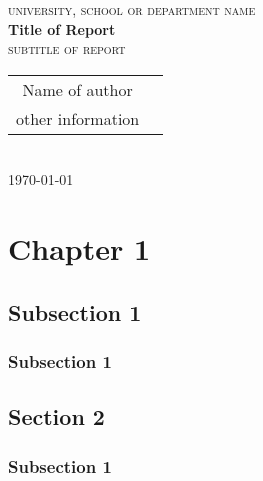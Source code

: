 \documentclass[10pt, a4paper, oneside]{report}
\begin{document}
\thispagestyle{empty}
\begin{center}
  \textsc{university, school or department name} \\ [60pt] 

  \textbf{{\LARGE Title of Report}} \\ [1pt]
  \textsc{{\large subtitle of report }} \\ [20pt]

  \begin{tabular}{cc}
    Name of author  \\
    other information
  \end{tabular} \\ [20pt]
  \today \\
\end{center}
\newpage

\begin{abstract}

\end{abstract}

\newpage

\tableofcontents

\newpage

\chapter{Chapter 1}
  \section{Subsection 1}
    \subsection{Subsection 1}
      \paragraph{}
      \paragraph{}
      \paragraph{}
  \section{Section 2}
    \subsection{Subsection 1}
\end{document}
